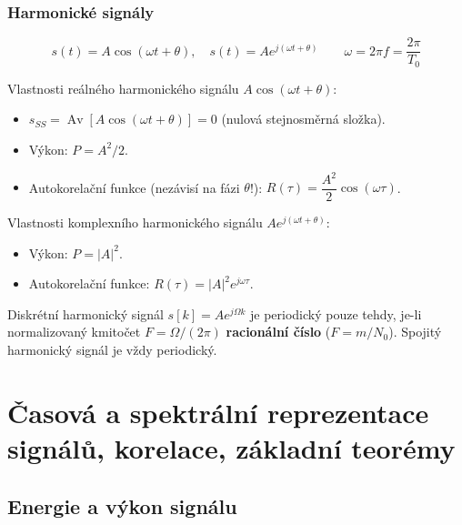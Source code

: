 \documentclass[12pt,a4paper]{article}
\newcommand{\Av}{\operatorname{Av}}
\begin{document}
\subsubsection*{Harmonické signály}

\begin{matBox}
\[
  s(t) = A\cos(\omega t + \theta), \quad s(t) = A e^{j(\omega t + \theta)}
  \qquad \omega = 2\pi f = \frac{2\pi}{T_0}
\]
\end{matBox}

Vlastnosti reálného harmonického signálu $A\cos(\omega t+\theta)$:
\begin{itemize}
  \item $s_{SS} = \Av[A\cos(\omega t+\theta)] = 0$ (nulová stejnosměrná složka).
  \item Výkon: $P = A^2/2$.
  \item Autokorelační funkce (nezávisí na fázi $\theta$!): $R(\tau) = \dfrac{A^2}{2}\cos(\omega\tau)$.
\end{itemize}

Vlastnosti komplexního harmonického signálu $A e^{j(\omega t+\theta)}$:
\begin{itemize}
  \item Výkon: $P = |A|^2$.
  \item Autokorelační funkce: $R(\tau) = |A|^2 e^{j\omega\tau}$.
\end{itemize}

\begin{noteBox}
Diskrétní harmonický signál $s[k] = A e^{j\Omega k}$ je periodický pouze tehdy, je-li normalizovaný kmitočet $F = \Omega/(2\pi)$ \textbf{racionální číslo} ($F = m/N_0$). Spojitý harmonický signál je vždy periodický.
\end{noteBox}

\newpage
\section{Časová a spektrální reprezentace signálů, korelace, základní teorémy}

\subsection*{Energie a výkon signálu}
\end{document}
